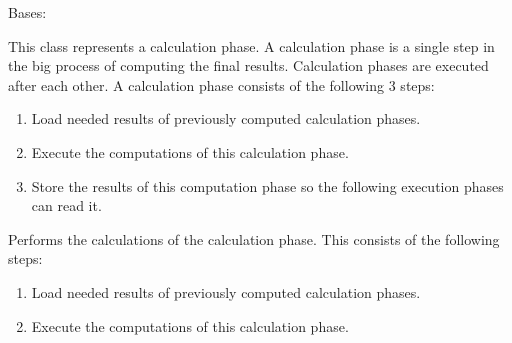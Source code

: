 \documentclass[letterpaper,10pt,english]{sphinxmanual}
\begin{document}
\begin{fulllineitems}
\label{\detokenize{apidoc/src.osm_configurator.model.project.calculation:src.osm_configurator.model.project.calculation.calculation_phase_interface.ICalculationPhase}}
\pysigstartsignatures
{}
\pysigstopsignatures
\sphinxAtStartPar
Bases: 

\sphinxAtStartPar
This class represents a calculation phase. A calculation phase is a single step in the big process of computing
the final results. Calculation phases are executed after each other. A calculation phase consists of the
following 3 steps:
\begin{enumerate}
%
\item {} 
\sphinxAtStartPar
Load needed results of previously computed calculation phases.

\item {} 
\sphinxAtStartPar
Execute the computations of this calculation phase.

\item {} 
\sphinxAtStartPar
Store the results of this computation phase so the following execution phases can read it.

\end{enumerate}

\begin{fulllineitems}
\label{\detokenize{apidoc/src.osm_configurator.model.project.calculation:src.osm_configurator.model.project.calculation.calculation_phase_interface.ICalculationPhase.calculate}}
\pysigstartsignatures
{}
\pysigstopsignatures
\sphinxAtStartPar
Performs the calculations of the calculation phase.
This consists of the following steps:
\begin{enumerate}
%
\item {} 
\sphinxAtStartPar
Load needed results of previously computed calculation phases.

\item {} 
\sphinxAtStartPar
Execute the computations of this calculation phase.


\end{enumerate}
\end{fulllineitems}
\end{fulllineitems}
\end{document}
